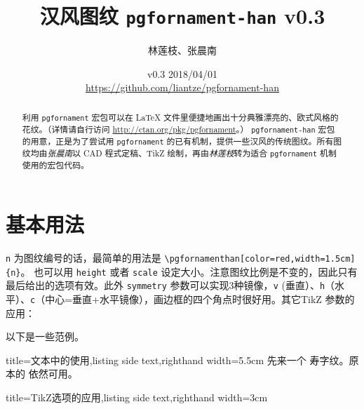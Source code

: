 \documentclass[fontset=fandol]{ctexart}
\title{汉风图纹 \texttt{pgfornament-han} v0.3}
\author{林莲枝、张晨南}
\date{v0.3 2018/04/01\\\url{https://github.com/liantze/pgfornament-han}}
\newcommand{\latexinline}[1]{\lstinline|#1|}
\begin{document}
\maketitle

\begin{abstract}
利用 \texttt{pgfornament} 宏包可以在 \LaTeX{} 文件里便捷地画出十分典雅漂亮的、欧式风格的花纹。（详情请自行访问 \url{http://ctan.org/pkg/pgfornament}。）
\texttt{pgfornament-han} 宏包的用意，正是为了尝试用 \texttt{pgfornament} 的已有机制，提供一些汉风的传统图纹。所有图纹均由\emph{张晨南}以 CAD 程式定稿、TikZ 绘制，再由\emph{林莲枝}转为适合 \texttt{pgfornament} 机制使用的宏包代码。
\end{abstract}

\part{基本用法}

\texttt{n} 为图纹编号的话，最简单的用法是 \latexinline{\pgfornamenthan[color=red,width=1.5cm]{n}}。
也可以用 \texttt{height} 或者 \texttt{scale} 设定大小。注意图纹比例是不变的，因此只有最后给出的选项有效。此外 \texttt{symmetry} 参数可以实现3种镜像，\texttt{v} (垂直）、\texttt{h}（水平）、\texttt{c}（中心=垂直+水平镜像），画边框的四个角点时很好用。其它TikZ 参数的应用：

\begin{latexcode}
\end{latexcode}

以下是一些范例。

\bigskip

\begin{tcblisting}{title={文本中的使用},listing side text,righthand width=5.5cm}
先来一个 
寿字纹。原本的  依然可用。
\end{tcblisting}

\enlargethispage{\baselineskip}


\begin{tcblisting}{title={TikZ选项的应用},listing side text,righthand width=3cm}
\end{tcblisting}
\end{document}
